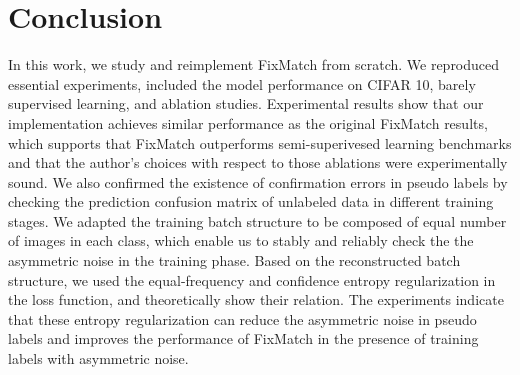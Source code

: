 \section{Conclusion}
In this work, we study and reimplement FixMatch from scratch. We reproduced essential experiments, included the model performance on CIFAR 10, barely supervised learning, and ablation studies.
Experimental results show that our implementation achieves similar performance as the original FixMatch results, which supports that FixMatch outperforms semi-superivesed learning benchmarks and that the author's choices with respect to those ablations were experimentally sound. 
We also confirmed the existence of confirmation errors in pseudo labels by checking the prediction confusion matrix of unlabeled data in different training stages.
We adapted the training batch structure to be composed of equal number of images in each class, which enable us to stably and reliably check the the asymmetric noise in the training phase. 
Based on the reconstructed batch structure, we used the equal-frequency and confidence entropy regularization in the loss function, and theoretically show their relation. 
The experiments indicate that these entropy regularization can reduce the asymmetric noise in pseudo labels and improves the performance of FixMatch in the presence of training labels with asymmetric noise.
